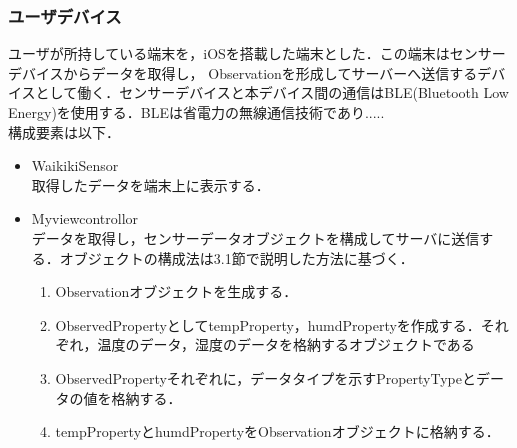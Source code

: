 \documentclass{kuisthesis}			%
\begin{document}
\subsubsection{ユーザデバイス}
ユーザが所持している端末を，iOSを搭載した端末とした．この端末はセンサーデバイスからデータを取得し， Observationを形成してサーバーへ送信するデバイスとして働く．センサーデバイスと本デバイス間の通信はBLE(Bluetooth Low Energy)を使用する．BLEは省電力の無線通信技術であり..... \\
構成要素は以下．
\begin{itemize}
\item WaikikiSensor\\
取得したデータを端末上に表示する．
\item Myviewcontrollor\\
データを取得し，センサーデータオブジェクトを構成してサーバに送信する．オブジェクトの構成法は3.1節で説明した方法に基づく．
\begin{enumerate}
\item Observationオブジェクトを生成する．
\item ObservedPropertyとしてtempProperty，humdPropertyを作成する．それぞれ，温度のデータ，湿度のデータを格納するオブジェクトである
\item ObservedPropertyそれぞれに，データタイプを示すPropertyTypeとデータの値を格納する．
\item tempPropertyとhumdPropertyをObservationオブジェクトに格納する．
\end{enumerate}
\end{itemize}
\end{document}
